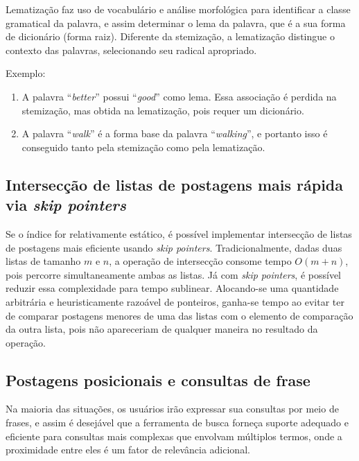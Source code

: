 Lematização faz uso de vocabulário e análise morfológica para identificar a classe gramatical da palavra, e assim determinar o lema da palavra, que é a sua forma de dicionário (forma raiz). Diferente da stemização, a lematização distingue o contexto das palavras, selecionando seu radical apropriado.

Exemplo: %

\begin{enumerate}
\item A palavra ``\emph{better}'' possui ``\emph{good}'' como lema. Essa associação é perdida na stemização, mas obtida na lematização, pois requer um dicionário.

\item A palavra ``\emph{walk}'' é a forma base da palavra ``\emph{walking}'', e portanto isso é conseguido tanto pela stemização como pela lematização.
\end{enumerate}

\subsection{Intersecção de listas de postagens mais rápida via \emph{skip pointers}}

Se o índice for relativamente estático, é possível implementar intersecção de listas de postagens mais eficiente usando \emph{skip pointers}. Tradicionalmente, dadas duas listas de tamanho $m$ e $n$, a operação de intersecção consome tempo $O(m+n)$, pois percorre simultaneamente ambas as listas. Já com \emph{skip pointers}, é possível reduzir essa complexidade para tempo sublinear. Alocando-se uma quantidade arbitrária e heuristicamente razoável de ponteiros, ganha-se tempo ao evitar ter de comparar postagens menores de uma das listas com o elemento de comparação da outra lista, pois não apareceriam de qualquer maneira no resultado da operação.

\subsection{Postagens posicionais e consultas de frase}

Na maioria das situações, os usuários irão expressar sua consultas por meio de frases, e assim é desejável que a ferramenta de busca forneça suporte adequado e eficiente para consultas mais complexas que envolvam múltiplos termos, onde a proximidade entre eles é um fator de relevância adicional.

